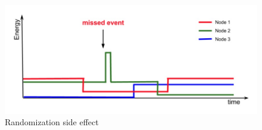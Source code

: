 \begin{figure}
		\centering
		\includegraphics[width=\columnwidth]{figures/randomizationSideEffect}
		\caption{ Randomization side effect}
		\label{fig:noRand}
\end{figure} 



